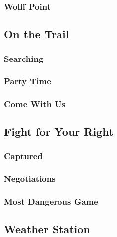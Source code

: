 \subsubsection{Wolff Point}


\subsection{On the Trail}


\subsubsection{Searching}


\subsubsection{Party Time}


\subsubsection{Come With Us}


\subsection{Fight for Your Right}


\subsubsection{Captured}


\subsubsection{Negotiations}


\subsubsection{Most Dangerous Game}


\subsection{Weather Station}


